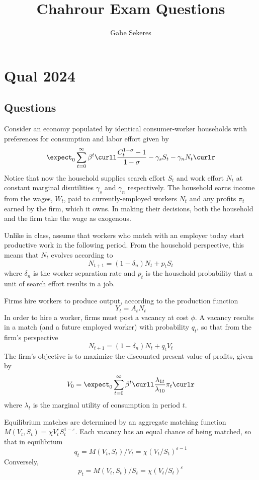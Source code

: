 \documentclass[10pt]{article}
\title{Chahrour Exam Questions}
\author{Gabe Sekeres}
\begin{document}
\maketitle


\tableofcontents

\newpage

\section{Qual 2024}

\subsection{Questions}

Consider an economy populated by identical consumer-worker households with preferences for consumption and labor effort given by
\[
\expect_0 \sum_{t=0}^\infty \beta^t \curll \frac{C_t^{1-\sigma} - 1}{1-\sigma} - \gamma_s S_t - \gamma_n N_t \curlr
\]
Notice that now the household supplies search effort $S_t$ and work effort $N_t$ at constant marginal disutilities $\gamma_s$ and $\gamma_n$ respectively. The household earns income from the wages, $W_t$, paid to currently-employed workers $N_t$ and any profits $\pi_t$ earned by the firm, which it owns. In making their decisions, both the household and the firm take the wage as exogenous.

Unlike in class, assume that workers who match with an employer today start productive work in the following period. From the household perspective, this means that $N_t$ evolves according to
\[
N_{t+1} = (1-\delta_n)N_t+p_tS_t
\]
where $\delta_n$ is the worker separation rate and $p_t$ is the household probability that a unit of search effort results in a job. 

Firms hire workers to produce output, according to the production function
\[
Y_t = A_tN_t
\]
In order to hire a worker, firms must post a vacancy at cost $\phi$. A vacancy results in a match (and a future employed worker) with probability $q_t$, so that from the firm's perspective
\[
N_{t+1} = (1-\delta_n) N_t + q_tV_t
\]
The firm's objective is to maximize the discounted present value of profits, given by
\[
V_0 = \expect_0 \sum_{t=0}^\infty \beta^t \curll \frac{\lambda_{1t}}{\lambda_{10}}\pi_t \curlr 
\]
where $\lambda_t$ is the marginal utility of consumption in period $t$. 

Equilibrium matches are determined by an aggregate matching function $M(V_t,S_t) = \chi V_t^\varepsilon S_t^{1-\varepsilon}$. Each vacancy has an equal chance of being matched, so that in equilibrium
\[
q_t = M(V_t,S_t) / V_t = \chi (V_t / S_t)^{\varepsilon - 1}
\]
Conversely,
\[
p_t = M(V_t,S_t) / S_t = \chi (V_t / S_t)^{\varepsilon}
\]
\end{document}
